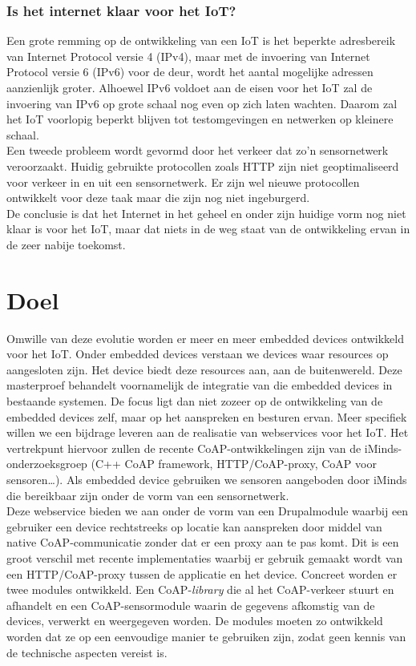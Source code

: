 \subsubsection{Is het internet klaar voor het IoT?}
Een grote remming op de ontwikkeling van een IoT is het beperkte adresbereik van Internet Protocol versie 4 (IPv4), maar met de invoering van Internet Protocol versie 6 (IPv6) voor de deur, wordt het aantal mogelijke adressen aanzienlijk groter.
Alhoewel IPv6 voldoet aan de eisen voor het IoT zal de invoering van IPv6 op grote schaal nog even op zich laten wachten. Daarom zal het IoT voorlopig beperkt blijven tot testomgevingen en netwerken op kleinere schaal.\\
Een tweede probleem wordt gevormd door het verkeer dat zo'n sensornetwerk veroorzaakt. Huidig gebruikte protocollen zoals HTTP zijn niet geoptimaliseerd voor verkeer in en uit een sensornetwerk. Er zijn wel nieuwe protocollen ontwikkelt voor deze taak maar die zijn nog niet ingeburgerd.\\
De conclusie is dat het Internet in het geheel en onder zijn huidige vorm nog niet klaar is voor het IoT, maar dat niets in de weg staat van de ontwikkeling ervan in de zeer nabije toekomst.

\section{Doel}
Omwille van deze evolutie worden er meer en meer embedded devices ontwikkeld voor het IoT. Onder embedded devices verstaan we devices waar resources op aangesloten zijn. Het device biedt deze resources aan, aan de buitenwereld. Deze masterproef behandelt voornamelijk de integratie van die embedded devices in bestaande systemen. De focus ligt dan niet zozeer op de ontwikkeling van de embedded devices zelf, maar op het aanspreken en besturen ervan. Meer specifiek willen we een bijdrage leveren aan de realisatie van webservices voor het IoT. Het vertrekpunt hiervoor zullen de recente CoAP-ontwikkelingen zijn van de iMinds-onderzoeksgroep (C++ CoAP framework, HTTP/CoAP-proxy, CoAP voor sensoren…). Als embedded device gebruiken we sensoren aangeboden door iMinds die bereikbaar zijn onder de vorm van een sensornetwerk.\\

Deze webservice bieden we aan onder de vorm van een Drupalmodule waarbij een gebruiker een device rechtstreeks op locatie kan aanspreken door middel van native CoAP-communicatie zonder dat er een proxy aan te pas komt. Dit is een groot verschil met recente implementaties waarbij er gebruik gemaakt wordt van een HTTP/CoAP-proxy tussen de applicatie en het device. Concreet worden er twee modules ontwikkeld. Een CoAP-\textit{library} die al het CoAP-verkeer stuurt en afhandelt en een CoAP-sensormodule waarin de gegevens afkomstig van de devices, verwerkt en weergegeven worden. De modules moeten zo ontwikkeld worden dat ze op een eenvoudige manier te gebruiken zijn, zodat geen kennis van de technische aspecten vereist is.

